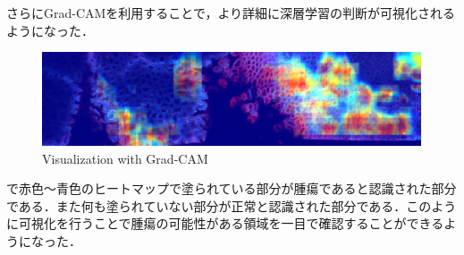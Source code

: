 さらにGrad-CAMを利用することで，より詳細に深層学習の判断が可視化されるようになった．

\begin{figure}[H]
	\centering
	\includegraphics[width=\linewidth]{fig/chapter4/large-grad-cam-step100-rm-black}
	\caption{Visualization with Grad-CAM}
	\label{fig:large-grad}
\end{figure}

で赤色〜青色のヒートマップで塗られている部分が腫瘍であると認識された部分である．また何も塗られていない部分が正常と認識された部分である．このように可視化を行うことで腫瘍の可能性がある領域を一目で確認することができるようになった．